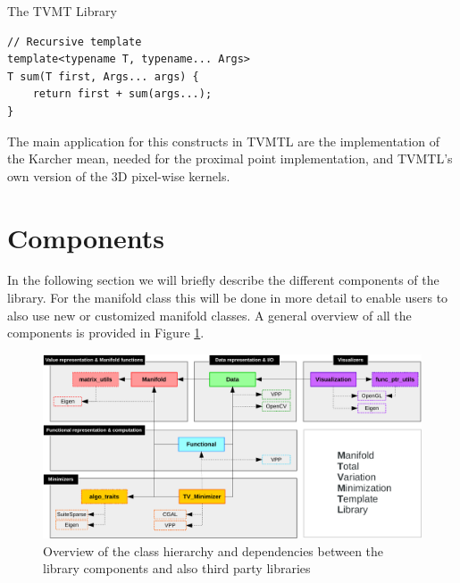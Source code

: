 \begin{chapter}{The TVMT Library}
\begin{lstlisting}[label=code:variadic,caption={Variadic template example}]
// Recursive template
template<typename T, typename... Args>
T sum(T first, Args... args) {
    return first + sum(args...);
}
\end{lstlisting}

The main application for this constructs in TVMTL are the implementation of the Karcher mean, needed for the proximal point implementation, and TVMTL's own version
of the 3D pixel-wise kernels.


\section{Components} %
\label{sec:Components}
In the following section we will briefly describe the different components of the library. For the manifold class this will be done in more detail to enable users to
also use new or customized manifold classes. A general overview of all the components is provided in Figure \ref{fig:components}.
\begin{figure}[h!]
        \centering
	    \includegraphics[width=1.0\linewidth]{./figures/library/components.pdf}
	\caption[Overview of library components]{Overview of the class hierarchy and dependencies between the library components and also third party libraries
	}
	\label{fig:components}
\end{figure}


\end{chapter}
